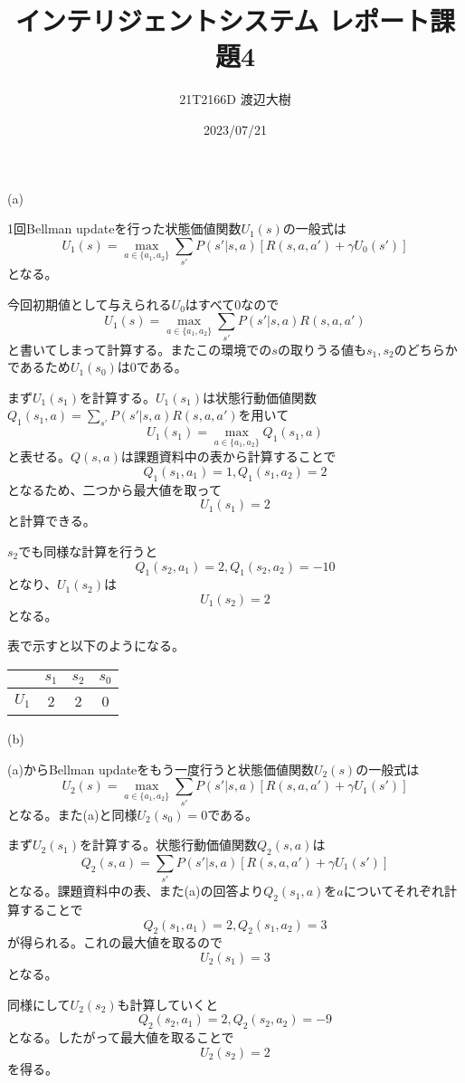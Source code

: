 \documentclass[a4paper,11pt,dvipdfmx]{jsarticle}
\begin{document}
\title{インテリジェントシステム レポート課題4}
\author{21T2166D 渡辺大樹}
\date{2023/07/21}
\maketitle

\section{}
(a)

1回Bellman updateを行った状態価値関数$U_1(s)$の一般式は
\[U_1(s)=\max_{a\in\{a_1,a_2\}}\sum_{s'}P(s'|s,a)[R(s,a,a')+\gamma U_0(s')]\]
となる。

今回初期値として与えられる$U_0$はすべて0なので
\[U_1(s)=\max_{a\in\{a_1,a_2\}}\sum_{s'}P(s'|s,a)R(s,a,a')\]
と書いてしまって計算する。またこの環境での$s$の取りうる値も$s_1,s_2$のどちらかであるため$U_1(s_0)$は0である。

まず$U_1(s_1)$を計算する。$U_1(s_1)$は状態行動価値関数$Q_1(s_1,a)=\sum_{s'}P(s'|s,a)R(s,a,a')$を用いて
\[U_1(s_1)=\max_{a\in\{a_1,a_2\}}Q_1(s_1,a)\]
と表せる。$Q(s,a)$は課題資料中の表から計算することで
\[Q_1(s_1,a_1)=1,Q_1(s_1,a_2)=2\]
となるため、二つから最大値を取って
\[U_1(s_1)=2\]
と計算できる。

$s_2$でも同様な計算を行うと
\[Q_1(s_2,a_1)=2,Q_1(s_2,a_2)=-10\]
となり、$U_1(s_2)$は
\[U_1(s_2)=2\]
となる。

表で示すと以下のようになる。
\begin{center}
    \begin{tabular}[h]{|c|c|c|c|} \hline
              & $s_1$ & $s_2$ & $s_0$ \\ \hline
        $U_1$ &   2   &   2   &   0   \\ \hline
    \end{tabular}
\end{center}

(b)

(a)からBellman updateをもう一度行うと状態価値関数$U_2(s)$の一般式は
\[U_2(s)=\max_{a\in\{a_1,a_2\}}\sum_{s'}P(s'|s,a)[R(s,a,a')+\gamma U_1(s')]\]
となる。また(a)と同様$U_2(s_0)=0$である。

まず$U_2(s_1)$を計算する。状態行動価値関数$Q_2(s,a)$は
\[Q_2(s,a)=\sum_{s'}P(s'|s,a)[R(s,a,a')+\gamma U_1(s')]\]
となる。課題資料中の表、また(a)の回答より$Q_2(s_1,a)$を$a$についてそれぞれ計算することで
\[Q_2(s_1,a_1)=2,Q_2(s_1,a_2)=3\]
が得られる。これの最大値を取るので
\[U_2(s_1)=3\]
となる。

同様にして$U_2(s_2)$も計算していくと
\[Q_2(s_2,a_1)=2,Q_2(s_2,a_2)=-9\]
となる。したがって最大値を取ることで
\[U_2(s_2)=2\]
を得る。
\end{document}
